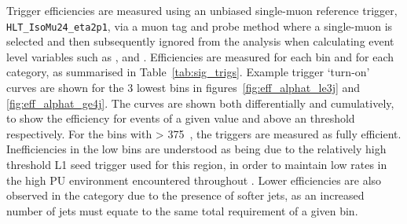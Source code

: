 Trigger efficiencies are measured using an unbiased single-muon reference
trigger,
\\\verb!HLT_IsoMu24_eta2p1!, via a muon tag and probe method where a
single-muon is selected and then subsequently ignored from the analysis when 
calculating event level variables such as \HT, \mht and \alphat. Efficiencies 
are measured for each \HT bin and for each \nj category, as summarised in 
Table~\ref{tab:sig_trigs}. Example trigger `turn-on' curves are shown for the 3 
lowest \HT bins in figures~\ref{fig:eff_alphat_le3j} and \ref{fig:eff_alphat_ge4j}.
The curves are shown both differentially and cumulatively, to show the
efficiency for events of a given \alphat value and above an \alphat threshold
respectively.
For the bins with \HT > 375~\gev, the triggers are measured as fully efficient.
Inefficiencies in the low \HT bins are
understood as being due to the relatively high threshold L1 seed trigger used
for this region, in order to maintain
low rates in the high PU environment encountered throughout \runone. Lower 
efficiencies are also observed in the \njhigh category due to the presence of 
softer jets, as an increased number of jets must equate to the same total \HT 
requirement of a given bin.


